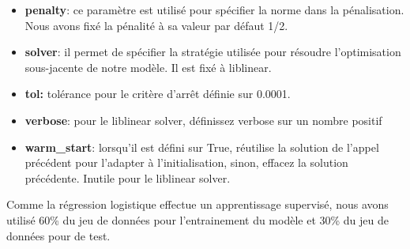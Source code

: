 \begin{itemize}
\item \textbf{penalty}: ce paramètre est utilisé pour spécifier la norme dans la pénalisation. Nous avons fixé la pénalité à sa valeur par défaut 1/2.
\item \textbf{solver}: il permet de spécifier la stratégie utilisée pour résoudre l'optimisation sous-jacente de notre modèle. Il est fixé à liblinear.
\item \textbf{tol:} tolérance pour le critère d'arrêt définie sur 0.0001.
\item \textbf{verbose}: pour le liblinear solver, définissez verbose sur un nombre positif 
\item \textbf{warm\_start}: lorsqu'il est défini sur True, réutilise la solution de l'appel précédent pour l'adapter à l'initialisation, sinon, effacez la solution précédente. Inutile pour le liblinear solver.
\end{itemize}
Comme la régression logistique effectue un apprentissage supervisé, nous avons utilisé 60\%  du jeu de données pour l’entrainement du modèle et 30\%  du jeu de données  pour  de test.

